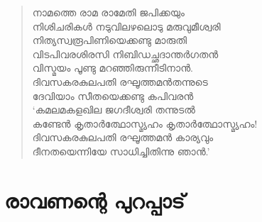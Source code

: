 \begin{verse}
നാമത്തെ രാമ രാമേതി ജപിക്കയും\\
നിശിചരികള്‍ നടുവിലഴലൊടു മരുവുമീശ്വരി\\
നിത്യസ്വരൂപിണിയെക്കണ്ടു മാരുതി\\
വിടപിവരശിരസി നിബിഡച്ഛദാന്തര്‍ഗതന്‍\\
വിസ്മയം പൂണ്ടു മറഞ്ഞിരുന്നീടിനാന്‍.\\
ദിവസകരകുലപതി രഘൂത്തമന്‍തന്നുടെ\\
ദേവിയാം സീതയെക്കണ്ടു കപിവരന്‍\\
‘കമലമകളഖില ജഗദീശ്വരി തന്നുടല്‍\\
കണ്ടേന്‍ കൃതാര്‍ത്ഥോസ്മ്യഹം കൃതാര്‍ത്ഥോസ്മ്യഹം!\\
ദിവസകരകുലപതി രഘൂത്തമന്‍ കാര്യവും\\
ദീനതയെന്നിയേ സാധിച്ചിതിന്നു ഞാന്‍.’
\end{verse}


\section{രാവണന്റെ പുറപ്പാട്}

